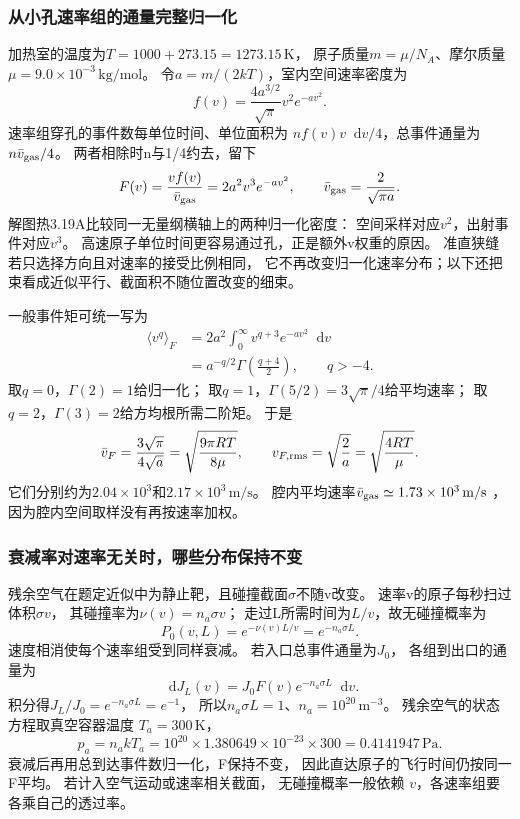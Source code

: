 \documentclass[UTF8,fontset=fandol,a4paper,11pt]{ctexart}
\newcommand{\dd}{\mathop{}\!\mathrm{d}}
\begin{document}
\subsubsection*{从小孔速率组的通量完整归一化}
加热室的温度为$T=1000+273.15=1273.15\,\mathrm K$，
原子质量$m=\mu/N_A$、摩尔质量$\mu=9.0\times10^{-3}\,\mathrm{kg/mol}$。
令$a=m/(2kT)$，室内空间速率密度为
\[
f(v)=\frac{4a^{3/2}}{\sqrt\pi}v^2e^{-av^2}.
\]
速率组穿孔的事件数每单位时间、单位面积为
$n f(v)v\dd v/4$，总事件通量为$n\bar v_{\rm gas}/4$。
两者相除时n与1/4约去，留下
\[
F(v)=\frac{vf(v)}{\bar v_{\rm gas}}
=2a^2v^3e^{-av^2},\qquad
\bar v_{\rm gas}=\frac{2}{\sqrt{\pi a}}.
\]
解图热3.19A比较同一无量纲横轴上的两种归一化密度：
空间采样对应$v^2$，出射事件对应$v^3$。
高速原子单位时间更容易通过孔，正是额外v权重的原因。
准直狭缝若只选择方向且对速率的接受比例相同，
它不再改变归一化速率分布；以下还把束看成近似平行、截面积不随位置改变的细束。

一般事件矩可统一写为
\[
\begin{aligned}
\langle v^q\rangle_F
&=2a^2\int_0^\infty v^{q+3}e^{-av^2}\dd v\\
&=a^{-q/2}\Gamma\left(\frac{q+4}{2}\right),
\qquad q>-4.
\end{aligned}
\]
取$q=0$，$\Gamma(2)=1$给归一化；
取$q=1$，$\Gamma(5/2)=3\sqrt\pi/4$给平均速率；
取$q=2$，$\Gamma(3)=2$给方均根所需二阶矩。
于是
\[
\bar v_F=\frac{3\sqrt\pi}{4\sqrt a}
=\sqrt{\frac{9\pi RT}{8\mu}},\qquad
v_{F,\rm rms}=\sqrt{\frac2a}
=\sqrt{\frac{4RT}{\mu}}.
\]
它们分别约为$2.04\times10^3$和$2.17\times10^3\,\mathrm{m/s}$。
腔内平均速率$\bar v_{\rm gas}\simeq1.73\times10^3\,\mathrm{m/s}$
，因为腔内空间取样没有再按速率加权。

\subsubsection*{衰减率对速率无关时，哪些分布保持不变}
残余空气在题定近似中为静止靶，且碰撞截面$\sigma$不随v改变。
速率v的原子每秒扫过体积$\sigma v$，
其碰撞率为$\nu(v)=n_a\sigma v$；
走过L所需时间为$L/v$，故无碰撞概率为
\[
P_0(v,L)=e^{-\nu(v)L/v}=e^{-n_a\sigma L}.
\]
速度相消使每个速率组受到同样衰减。
若入口总事件通量为$J_0$，
各组到出口的通量为
\[
\dd J_L(v)=J_0F(v)e^{-n_a\sigma L}\dd v.
\]
积分得$J_L/J_0=e^{-n_a\sigma L}=e^{-1}$，
所以$n_a\sigma L=1$、$n_a=10^{20}\,\mathrm{m^{-3}}$。
残余空气的状态方程取真空容器温度 $T_a=300$\,K，
\[
p_a=n_akT_a
=10^{20}\times1.380649\times10^{-23}\times300
=0.4141947\,\mathrm{Pa}.
\]
衰减后再用总到达事件数归一化，F保持不变，
因此直达原子的飞行时间仍按同一F平均。
若计入空气运动或速率相关截面，
无碰撞概率一般依赖 $v$，各速率组要各乘自己的透过率。
\end{document}
